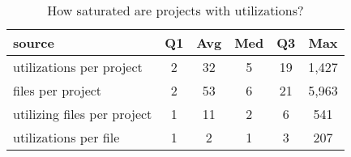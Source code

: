 \begin{table}[ht]
\begin{center}
\begin{small}
\caption{How saturated are projects with utilizations?}
\label{table:saturation}

\begin{tabular}{l|ccccc}
\toprule
source & Q1 & Avg & Med & Q3 & Max \\
 \midrule \bigstrut
utilizations per project & 2 & 32 & 5 & 19 & 1,427 \\
 \midrule \bigstrut
files per project & 2 & 53 & 6 & 21 & 5,963 \\
 \midrule \bigstrut
utilizing files per project & 1 & 11 & 2 & 6 & 541 \\
 \midrule \bigstrut
utilizations per file & 1 & 2 & 1 & 3 & 207 \\
\bottomrule
\end{tabular}
\end{small}
\end{center}
\vspace{-12pt}
\end{table}
